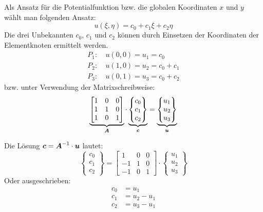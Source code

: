 Als Ansatz für die Potentialfunktion bzw. die globalen Koordinaten $x$ und $y$ wählt man folgenden Ansatz:
\begin{equation}
 \label{eq:linear_triangle_eq}
u(\xi, \eta) = c_0 + c_1 \xi + c_2 \eta
\end{equation}
Die drei Unbekannten $c_0$, $c_1$ und $c_2$ können durch Einsetzen der Koordinaten der Elementknoten ermittelt werden. 
\begin{align}
P_1:&\ u(0,0) = u_1 = c_0\\
P_2:&\ u(1,0) = u_2 = c_0 + c_1 \nonumber \\
P_3:&\ u(0,1) = u_3 = c_0 + c_2 \nonumber
\end{align}
 bzw. unter Verwendung der Matrixschreibweise:
 \begin{equation}
 \label{eq:linear_triangle_matrix_eq}
 \underbrace{
 \begin{bmatrix}
 1 & 0 & 0 \\
 1 & 1 & 0 \\
 1 & 0 & 1
 \end{bmatrix}}_{\boldsymbol{A}} \cdot 
\underbrace{
 \begin{Bmatrix}
 c_0 \\ c_1 \\ c_2
 \end{Bmatrix}}_{\boldsymbol{c}} = 
\underbrace{
 \begin{Bmatrix}
 u_1 \\ u_2 \\ u_3
 \end{Bmatrix}}_{\boldsymbol{u}}
 \end{equation}
 
 Die Lösung $\boldsymbol{c} = \boldsymbol{A}^{-1}\cdot\boldsymbol{u}$ lautet:
 \begin{equation}
\begin{Bmatrix}
c_0 \\ c_1 \\ c_2
\end{Bmatrix} = 
\begin{bmatrix}
1 & 0 & 0 \\
-1 & 1 & 0 \\
-1 & 0 & 1
\end{bmatrix}
 \cdot 
 \begin{Bmatrix}
 	u_1 \\ u_2 \\ u_3
 \end{Bmatrix}
\end{equation}
Oder ausgeschrieben:
\begin{align}
	c_0 &= u_1 \\
	c_1 &= u_2 - u_1 \nonumber\\
	c_2 &= u_3 - u_1 \nonumber
\end{align}

